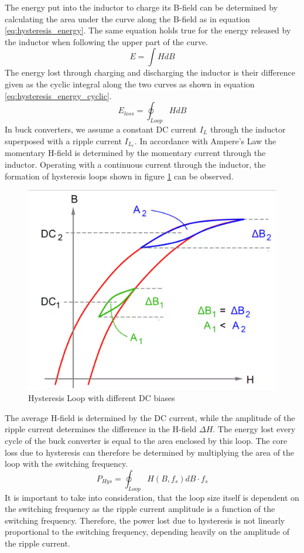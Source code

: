 The energy put into the inductor to charge its B-field can be determined by calculating the area under the curve along the B-field as in equation \ref{eq:hysteresis_energy}. The same equation holds true for the energy released by the inductor when following the upper part of the curve.
\begin{equation}
        E = \int H dB \label{eq:hysteresis_energy}
\end{equation}
The energy lost through charging and discharging the inductor is their difference given as the cyclic integral along the two curves as shown in equation \ref{eq:hysteresis_energy_cyclic}.
\begin{equation}
    E_{loss} = \oint_{Loop} H dB \label{eq:hysteresis_energy_cyclic}
\end{equation}
In buck converters, we assume a constant DC current $I_L$ through the inductor superposed with a ripple current $I_{L_r}$. In accordance with Ampere's Law the momentary H-field is determined by the momentary current through the inductor. Operating with a continuous current through the inductor, the formation of hysteresis loops shown in figure \ref{fig:DC_Bias_Hysteresis} can be observed. 
\begin{figure}[H]
    \centering
    \includegraphics[width=0.4\linewidth]{Bilder//Kapitel2/DC_Bias_Hysteresis.png}
    \caption{Hysteresis Loop with different DC biases}
    \label{fig:DC_Bias_Hysteresis}
\end{figure}
The average H-field is determined by the DC current, while the amplitude of the ripple current determines the difference in the H-field $\Delta H$. The energy lost every cycle of the buck converter is equal to the area enclosed by this loop. The core loss due to hysteresis can therefore be determined by multiplying the area of the loop with the switching frequency.
\begin{equation}
    P_{Hys} = \oint_{Loop} H\left(B,f_s\right)  dB \cdot f_s
\end{equation}
It is important to take into consideration, that the loop size itself is dependent on the switching frequency as the ripple current amplitude is a function of the switching frequency. Therefore, the power lost due to hysteresis is not linearly proportional to the switching frequency, depending heavily on the amplitude of the ripple current.

